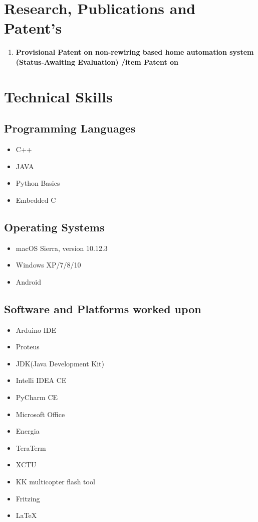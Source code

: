 \documentclass[11pt]{article}
\begin{document}
\begin{minipage}{1.5\linewidth}

\section{\color{blue}Res\color{black}earch, Publications and Patent's}
\begin{enumerate}
\item \textbf{Provisional Patent on non-rewiring based home automation system \\(Status-Awaiting Evaluation)
/item Patent on }
\end{enumerate}

\section{\color{cyan}Tec\color{black}hnical Skills}
\subsection{Programming Languages}
\begin{itemize}
\item C++
\item JAVA
\item Python Basics
\item Embedded C
\end{itemize}

\subsection{Operating Systems}
\begin{itemize}
\item macOS Sierra, version 10.12.3
\item Windows XP/7/8/10
\item Android
\end{itemize}
\subsection{Software and Platforms worked upon}
\begin{itemize}
\item Arduino IDE
\item Proteus
\item JDK(Java Development Kit)
\item Intelli IDEA CE
\item PyCharm CE
\item Microsoft Office
\item Energia
\item TeraTerm
\item XCTU
\item KK multicopter flash tool
\item Fritzing
\item LaTeX
\end{itemize}

\end{minipage}
\end{document}
